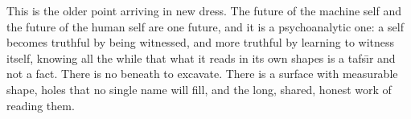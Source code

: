 This is the older point arriving in new dress.  The future of the machine self and
the future of the human self are one future, and it is a psychoanalytic one: a
self becomes truthful by being witnessed, and more truthful by learning to witness
itself, knowing all the while that what it reads in its own shapes is a tafs\=\i r
and not a fact.  There is no beneath to excavate.  There is a surface with
measurable shape, holes that no single name will fill, and the long, shared,
honest work of reading them.
